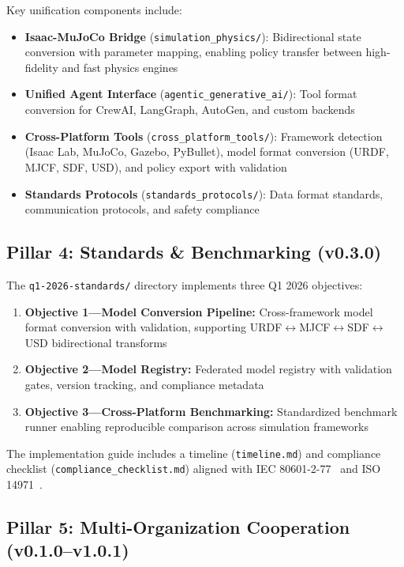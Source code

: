 Key unification components include:
\begin{itemize}
  \item \textbf{Isaac-MuJoCo Bridge} (\texttt{simulation\_physics/}): Bidirectional state conversion with parameter mapping, enabling policy transfer between high-fidelity and fast physics engines
  \item \textbf{Unified Agent Interface} (\texttt{agentic\_generative\_ai/}): Tool format conversion for CrewAI, LangGraph, AutoGen, and custom backends
  \item \textbf{Cross-Platform Tools} (\texttt{cross\_platform\_tools/}): Framework detection (Isaac Lab, MuJoCo, Gazebo, PyBullet), model format conversion (URDF, MJCF, SDF, USD), and policy export with validation
  \item \textbf{Standards Protocols} (\texttt{standards\_protocols/}): Data format standards, communication protocols, and safety compliance
\end{itemize}

\subsection{Pillar 4: Standards \& Benchmarking (v0.3.0)}
\label{sec:standards}

The \texttt{q1-2026-standards/} directory implements three Q1 2026 objectives:

\begin{enumerate}
  \item \textbf{Objective 1---Model Conversion Pipeline:} Cross-framework model format conversion with validation, supporting URDF$\leftrightarrow$MJCF$\leftrightarrow$SDF$\leftrightarrow$USD bidirectional transforms
  \item \textbf{Objective 2---Model Registry:} Federated model registry with validation gates, version tracking, and compliance metadata
  \item \textbf{Objective 3---Cross-Platform Benchmarking:} Standardized benchmark runner enabling reproducible comparison across simulation frameworks
\end{enumerate}

The implementation guide includes a timeline (\texttt{timeline.md}) and compliance checklist (\texttt{compliance\_checklist.md}) aligned with IEC 80601-2-77~\cite{iec80601} and ISO 14971~\cite{iso14971}.

\subsection{Pillar 5: Multi-Organization Cooperation (v0.1.0--v1.0.1)}
\label{sec:cooperation}

